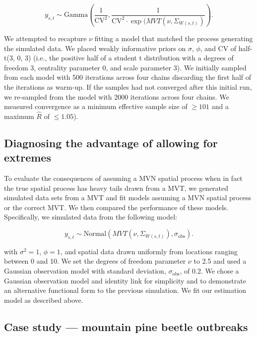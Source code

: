 \documentclass[12pt,english]{article}
\begin{document}
\begin{spacing}{1.25}
\begin{equation}
  y_{s,t} \sim \mathrm{Gamma} \left( \frac{1}{\mathrm{CV}^2},
  \frac{1}{\mathrm{CV}^2 \cdot \exp(MVT(\nu, \Sigma_{W(s,t)})} \right).
\end{equation}

We attempted to recapture $\nu$ fitting a model that matched the process
generating the simulated data. We placed weakly informative priors on $\sigma$,
$\phi$, and CV of half-t(3, 0, 3) (i.e., the positive half of a student t
distribution with a degrees of freedom 3, centrality parameter 0, and scale
parameter 3). We initially sampled from each model with 500 iterations across
four chains discarding the first half of the iterations as warm-up. If the
samples had not converged after this initial run, we re-sampled from the model
with 2000 iterations across four chains. We measured convergence as a minimum
effective sample size of $\ge 101$ and a maximum $\hat{R}$ of $\le 1.05$). 

\subsection{Diagnosing the advantage of allowing for extremes}

To evaluate the consequences of assuming a MVN spatial process when in fact the
true spatial process has heavy tails drawn from a MVT, we generated simulated
data sets from a MVT and fit models assuming a MVN spatial process or the
correct MVT. We then compared the performance of these models. Specifically, we
simulated data from the following model:

\begin{equation}
  y_{s,t} \sim \mathrm{Normal} \left(MVT(\nu, \Sigma_{W(s,t)}), \sigma_{\mathrm{obs}} \right).
\end{equation}

\noindent with $\sigma^2 = 1$, $\phi = 1$, and spatial data drawn uniformly
from locations ranging between 0 and 10. We set the degrees of freedom
parameter $\nu$ to 2.5 and used a Gaussian observation model with standard
deviation, $\sigma_{\mathrm{obs}}$, of 0.2. We chose a Gaussian observation
model and identity link for simplicity and to demonstrate an alternative
functional form to the previous simulation. We fit our estimation model as
described above.

\subsection{Case study --- mountain pine beetle outbreaks}


\end{spacing}
\end{document}
